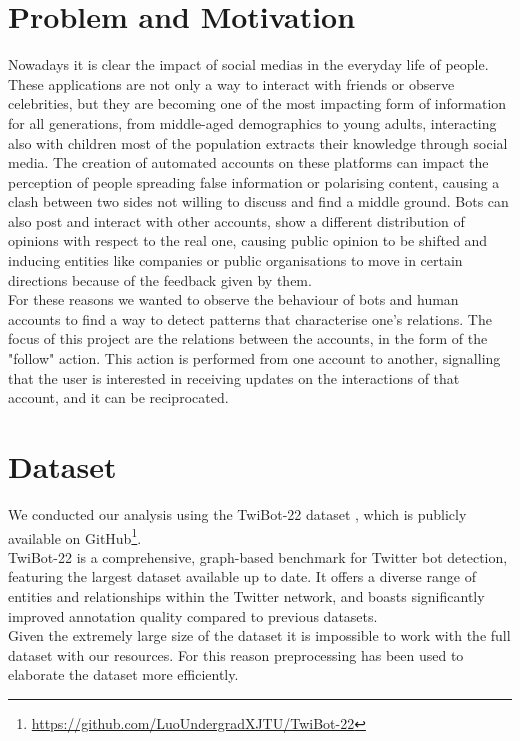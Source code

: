 \documentclass[12pt, a4paper]{article}
\begin{document}
\section{Problem and Motivation} \label{problem-and-motivation}
    Nowadays it is clear the impact of social medias in the everyday life of people. These applications are not only a way to interact with friends or observe celebrities, but they are becoming one of the most impacting form of information for all generations, from middle-aged demographics to young adults, interacting also with children most of the population extracts their knowledge through social media. The creation of automated accounts on these platforms can impact the perception of people spreading false information or polarising content, causing a clash between two sides not willing to discuss and find a middle ground. Bots can also post and interact with other accounts, show a different distribution of opinions with respect to the real one, causing public opinion to be shifted and inducing entities like companies or public organisations to move in certain directions because of the feedback given by them.\\
    For these reasons we wanted to observe the behaviour of bots and human accounts to find a way to detect patterns that characterise one's relations. The focus of this project are the relations between the accounts, in the form of the "follow" action. This action is performed from one account to another, signalling that the user is interested in receiving updates on the interactions of that account, and it can be reciprocated.


\section{Dataset} \label{dataset}
	We conducted our analysis using the TwiBot-22 dataset \cite{twibot22}, which is publicly available on GitHub\footnote{\href{https://github.com/LuoUndergradXJTU/TwiBot-22}{https://github.com/LuoUndergradXJTU/TwiBot-22}}.\\
	TwiBot-22 is a comprehensive, graph-based benchmark for Twitter bot detection, featuring the largest dataset available up to date. It offers a diverse range of entities and relationships within the Twitter network, and boasts significantly improved annotation quality compared to previous datasets.\\
	Given the extremely large size of the dataset it is impossible to work with the full dataset with our resources. For this reason preprocessing has been used to elaborate the dataset more efficiently.
\end{document}
